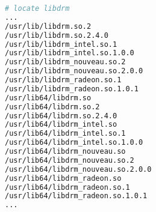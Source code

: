 \begin{lstlisting}[language=bash]
# locate libdrm
...
/usr/lib/libdrm.so.2
/usr/lib/libdrm.so.2.4.0
/usr/lib/libdrm_intel.so.1
/usr/lib/libdrm_intel.so.1.0.0
/usr/lib/libdrm_nouveau.so.2
/usr/lib/libdrm_nouveau.so.2.0.0
/usr/lib/libdrm_radeon.so.1
/usr/lib/libdrm_radeon.so.1.0.1
/usr/lib64/libdrm.so
/usr/lib64/libdrm.so.2
/usr/lib64/libdrm.so.2.4.0
/usr/lib64/libdrm_intel.so
/usr/lib64/libdrm_intel.so.1
/usr/lib64/libdrm_intel.so.1.0.0
/usr/lib64/libdrm_nouveau.so
/usr/lib64/libdrm_nouveau.so.2
/usr/lib64/libdrm_nouveau.so.2.0.0
/usr/lib64/libdrm_radeon.so
/usr/lib64/libdrm_radeon.so.1
/usr/lib64/libdrm_radeon.so.1.0.1
...
\end{lstlisting}




























































